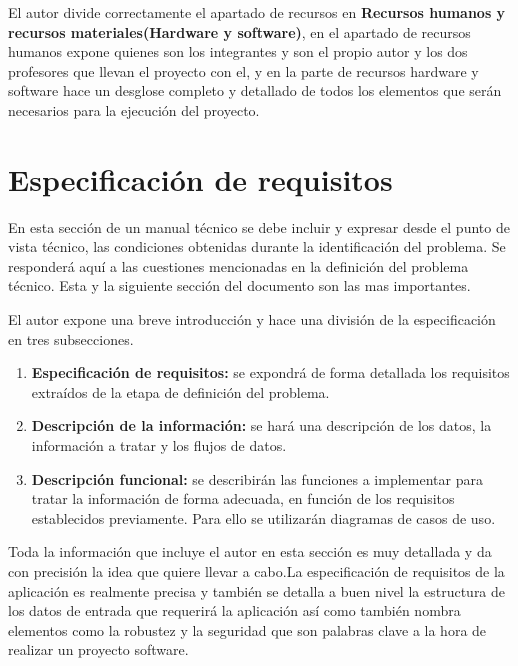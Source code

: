 El autor divide correctamente el apartado de recursos en \textbf{Recursos humanos y recursos materiales(Hardware y software)}, en el apartado de recursos humanos expone quienes son los integrantes y son el propio autor y los dos profesores que llevan el proyecto con el, y en la parte de recursos hardware y software hace un desglose completo y detallado de todos los elementos que serán necesarios para la ejecución del proyecto.

\hspace{15px}


\section{Especificación de requisitos}
En esta sección de un manual técnico se debe incluir y expresar desde el punto de vista técnico, las condiciones obtenidas durante la identificación del problema. Se responderá aquí a las cuestiones mencionadas en la definición del problema técnico. Esta y la siguiente sección del documento son las mas importantes.

El autor expone una breve introducción y hace una división de la especificación en tres subsecciones.
    \begin{enumerate}
        \item \textbf{Especificación de requisitos: } se expondrá de forma detallada los requisitos extraídos de la etapa de definición del problema.
        \item \textbf{Descripción de la información: } se hará una descripción de los datos, la información a tratar y los flujos de datos.
        \item \textbf{Descripción funcional: } se describirán las funciones a implementar para tratar la información de forma adecuada, en función de los requisitos establecidos previamente. Para ello se utilizarán diagramas de casos de uso.
    \end{enumerate}

Toda la información que incluye el autor en esta sección es muy detallada y da con precisión la idea que quiere llevar a cabo.La especificación de requisitos de la aplicación es realmente precisa y también se detalla a buen nivel la estructura de los datos de entrada que requerirá la aplicación así como también nombra elementos como la robustez y la seguridad que son palabras clave a la hora de realizar un proyecto software.

